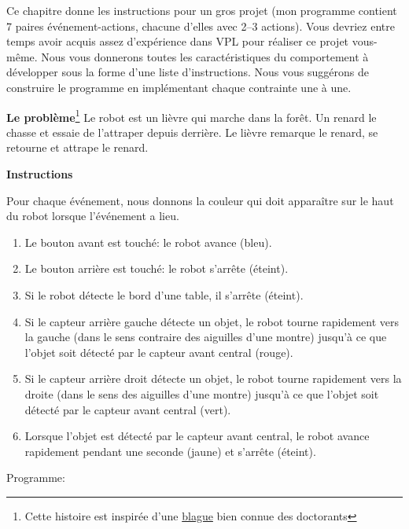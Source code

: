 \label{ch.rabbit}

Ce chapitre donne les instructions pour un gros projet (mon programme
contient 7 paires événement-actions, chacune d'elles avec 2--3
actions).
Vous devriez entre temps avoir acquis assez d'expérience dans VPL
pour réaliser ce projet vous-même. Nous vous donnerons toutes les
caractéristiques du comportement à développer sous la forme d'une
liste d'instructions. Nous vous suggérons de construire le programme en
implémentant chaque contrainte une à une.

\textbf{Le problème}\footnote{Cette histoire est inspirée d'une \href{
http://www.cs.hmc.edu/~fleck/parable.html}{blague} bien connue
des doctorants}
Le robot est un lièvre qui marche dans la forêt.
Un renard le chasse et essaie de l'attraper depuis derrière.
Le lièvre remarque le renard, se retourne et attrape le renard.


\textbf{Instructions}

Pour chaque événement, nous donnons la couleur qui doit apparaître
sur le haut du robot lorsque l'événement a lieu.

\begin{enumerate}
\item Le bouton avant est touché: le robot avance (bleu).
\item Le bouton arrière est touché: le robot s'arrête (éteint).
\item Si le robot détecte le bord d'une table, il s'arrête (éteint).
\item Si le capteur arrière gauche détecte un objet, le robot tourne rapidement
vers la gauche (dans le sens contraire des aiguilles d'une montre) jusqu'à ce que
l'objet soit détecté par le capteur avant central (rouge).
\item Si le capteur arrière droit détecte un objet, le robot tourne rapidement
vers la droite (dans le sens des aiguilles d'une montre)
jusqu'à ce que l'objet soit détecté par le capteur avant central (vert).
\item Lorsque l'objet est détecté par le capteur avant central, le
robot avance rapidement pendant une seconde (jaune) et s'arrête (éteint).
\end{enumerate}

{\raggedleft \hfill Programme: }
